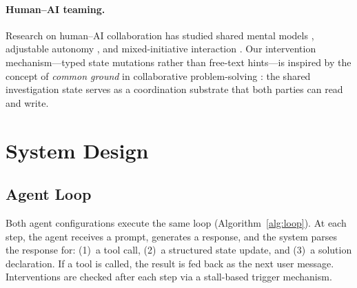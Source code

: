 \documentclass[letterpaper]{article}
\begin{document}
\paragraph{Human--AI teaming.}
Research on human--AI collaboration has studied shared mental models \citep{johnson2014coactive}, adjustable autonomy \citep{bradshaw2004making}, and mixed-initiative interaction \citep{horvitz1999principles}.
Our intervention mechanism---typed state mutations rather than free-text hints---is inspired by the concept of \emph{common ground} in collaborative problem-solving \citep{clark1996using}: the shared investigation state serves as a coordination substrate that both parties can read and write.

\section{System Design}

\subsection{Agent Loop}

Both agent configurations execute the same loop (Algorithm~\ref{alg:loop}).
At each step, the agent receives a prompt, generates a response, and the system parses the response for: (1)~a tool call, (2)~a structured state update, and (3)~a solution declaration.
If a tool is called, the result is fed back as the next user message.
Interventions are checked after each step via a stall-based trigger mechanism.
\end{document}
